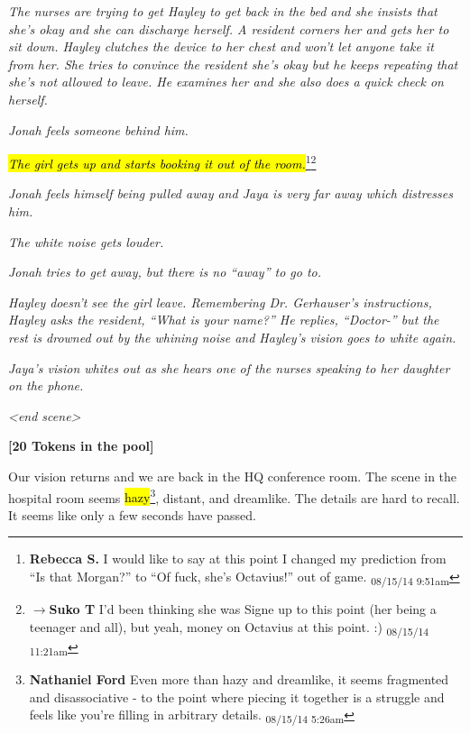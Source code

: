 \textit{The nurses are trying to get Hayley to get back in the bed and she insists that she's okay and she can discharge herself.  A resident corners her and gets her to sit down.  Hayley clutches the device to her chest and won't let anyone take it from her.  She tries to convince the resident she's okay but he keeps repeating that she's not allowed to leave.  He examines her and she also does a quick check on herself.  }





\textit{Jonah feels someone behind him.}



\textit{\hl{The girl gets up and starts booking it out of the room.}}\footnote{\textbf{Rebecca S. }I would like to say at this point I changed my prediction from ``Is that Morgan?'' to ``Of fuck, she's Octavius!'' out of game. \textsubscript{08/15/14 9:51am}}\footnote{$\rightarrow$\textbf{Suko T }I'd been thinking she was Signe up to this point (her being a teenager and all), but yeah, money on Octavius at this point. :) \textsubscript{08/15/14 11:21am}}



\textit{Jonah feels himself being pulled away and Jaya is very far away which distresses him.}



\textit{The white noise gets louder.}



\textit{Jonah tries to get away, but there is no ``away'' to go to.}



\textit{Hayley doesn't see the girl leave.  Remembering Dr. Gerhauser's instructions, Hayley asks the resident, ``What is your name?'' He replies, ``Doctor-'' but the rest is drowned out by the whining noise and Hayley's vision goes to white again.}



\textit{Jaya's vision whites out as she hears one of the nurses speaking to her daughter on the phone.}



\textit{\textless end scene\textgreater }



\textbf{{[}20 Tokens in the pool{]}}



Our vision returns and we are back in the HQ conference room.  The scene in the hospital room seems \hl{hazy}\footnote{\textbf{Nathaniel Ford }Even more than hazy and dreamlike, it seems fragmented and disassociative - to the point where piecing it together is a struggle and feels like you're filling in arbitrary details. \textsubscript{08/15/14 5:26am}}, distant, and dreamlike.  The details are hard to recall.  It seems like only a few seconds have passed.



